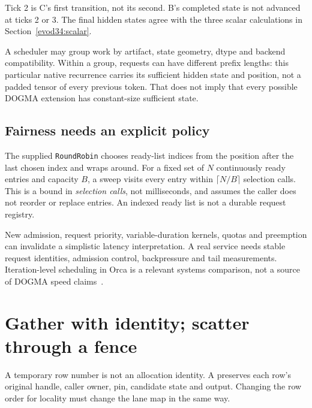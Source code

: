 \begin{center}\end{center}
Tick 2 is C's first transition, not its second. B's completed state is not
advanced at ticks 2 or 3. The final hidden states agree with the three scalar
calculations in Section~\ref{evod34:scalar}.

A scheduler may group work by artifact, state geometry, dtype and backend
compatibility. Within a group, requests can have different prefix lengths:
this particular native recurrence carries its sufficient hidden state and
position, not a padded tensor of every previous token. That does not imply
that every possible DOGMA extension has constant-size sufficient state.

\subsection{Fairness needs an explicit policy}
The supplied \texttt{RoundRobin} chooses ready-list indices from the position
after the last chosen index and wraps around. For a fixed set of $N$ continuously
ready entries and capacity $B$, a sweep visits every entry within
$\lceil N/B\rceil$ selection calls. This is a bound in \emph{selection calls},
not milliseconds, and assumes the caller does not reorder or replace entries.
An indexed ready list is not a durable request registry.


New admission, request priority, variable-duration kernels, quotas and
preemption can invalidate a simplistic latency interpretation. A real service
needs stable request identities, admission control, backpressure and tail
measurements. Iteration-level scheduling in Orca is a relevant systems
comparison, not a source of DOGMA speed claims~\cite{orca}.

\section{Gather with identity; scatter through a fence}
\label{evod34:gather}
A temporary row number is not an allocation identity.
A  preserves each row's original handle, caller owner, pin,
candidate state and output. Changing the row order for locality must change
the lane map in the same way.


